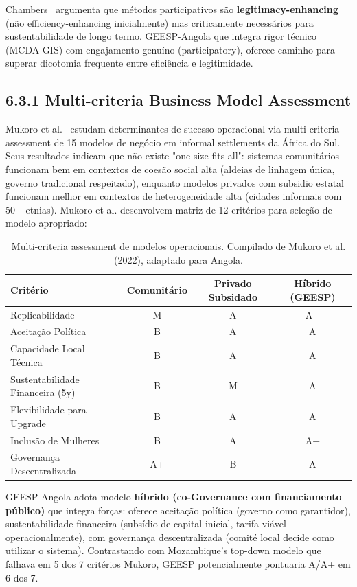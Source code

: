 \documentclass[12pt, a4paper]{article}
\begin{document}
Chambers~\citep{Chambers2019} argumenta que métodos participativos são \textbf{legitimacy-enhancing} (não efficiency-enhancing inicialmente) mas criticamente necessários para sustentabilidade de longo termo. GEESP-Angola que integra rigor técnico (MCDA-GIS) com engajamento genuíno (participatory), oferece caminho para superar dicotomia frequente entre eficiência e legitimidade.

\subsection*{6.3.1 Multi-criteria Business Model Assessment}

Mukoro et al.~\citep{Mukoro2022} estudam determinantes de sucesso operacional via multi-criteria assessment de 15 modelos de negócio em informal settlements da África do Sul. Seus resultados indicam que não existe "one-size-fits-all": sistemas comunitários funcionam bem em contextos de coesão social alta (aldeias de linhagem única, governo tradicional respeitado), enquanto modelos privados com subsidio estatal funcionam melhor em contextos de heterogeneidade alta (cidades informais com 50+ etnias). Mukoro et al. desenvolvem matriz de 12 critérios para seleção de modelo apropriado:

\begin{table}[h]
\centering
\footnotesize
\begin{tabular}{|l|c|c|c|}
\hline
\textbf{Critério} & \textbf{Comunitário} & \textbf{Privado Subsidado} & \textbf{Híbrido (GEESP)} \\
\hline
Replicabilidade & M & A & A+ \\
Aceitação Política & B & A & A \\
Capacidade Local Técnica & B & A & A \\
Sustentabilidade Financeira (5y) & B & M & A \\
Flexibilidade para Upgrade & B & A & A \\
Inclusão de Mulheres & B & A & A+ \\
Governança Descentralizada & A+ & B & A \\
\hline
\end{tabular}
\caption{Multi-criteria assessment de modelos operacionais. Compilado de Mukoro et al. (2022), adaptado para Angola.}
\label{tab:business_models}
\end{table}

GEESP-Angola adota modelo \textbf{híbrido (co-Governance com financiamento público)} que integra forças: oferece aceitação política (governo como garantidor), sustentabilidade financeira (subsídio de capital inicial, tarifa viável operacionalmente), com governança descentralizada (comité local decide como utilizar o sistema). Contrastando com Mozambique's top-down modelo que falhava em 5 dos 7 critérios Mukoro, GEESP potencialmente pontuaria A/A+ em 6 dos 7.
\end{document}
